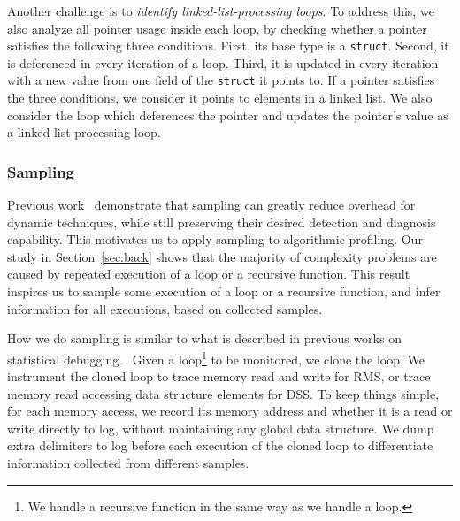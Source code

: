 Another challenge is to \emph{identify linked-list-processing loops}.
To address this, we also analyze all pointer usage inside each loop, 
by checking whether a pointer satisfies the following three conditions.
First, its base type is a \texttt{struct}.
Second, it is deferenced in every iteration of a loop.
Third, it is updated in every iteration with a new value 
from one field of the \texttt{struct} it points to.
If a pointer satisfies the three conditions, 
we consider it points to elements in a linked list.
We also consider the loop which deferences the pointer and 
updates the pointer's value as  
a linked-list-processing loop. 



\subsubsection{Sampling}


Previous work~\cite{liblit03,liblit05,CCI,SongOOPSLA2014,ldoctor}
demonstrate that sampling can greatly 
reduce overhead for dynamic techniques,
while still preserving their desired 
detection and diagnosis capability. 
This motivates us to apply sampling to algorithmic profiling. 
Our study in Section~\ref{sec:back} shows that 
the majority of complexity problems are caused by repeated execution of a loop
or a recursive function. 
This result inspires us to sample some execution of 
a loop or a recursive function,
and infer information for all executions, 
based on collected samples.


How we do sampling is similar to what is described in previous works 
on statistical debugging~\cite{liblit03,liblit05,CCI,SongOOPSLA2014,ldoctor}.
Given a loop\footnote{We handle a recursive function 
in the same way as we handle a loop.} to be monitored, 
we clone the loop.
We instrument the cloned loop to trace memory read and write for RMS, 
or trace memory read accessing data structure elements for DSS.
To keep things simple, 
for each memory access, we record its memory address 
and whether it is a read or write directly to log, 
without maintaining any global data structure. 
We dump extra delimiters to log before each execution of the cloned loop 
to differentiate information collected 
from different samples.

